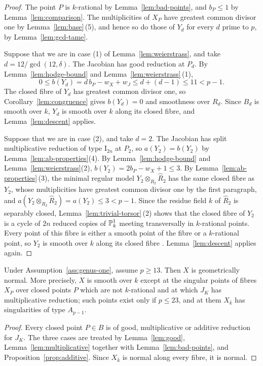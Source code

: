 \begin{proof}
The point $P$ is $k$-rational by Lemma~\ref{lem:bad-points}, and $b_P\leq 1$ by Lemma~\ref{lem:comparison}.
The multiplicities of $X_P$ have greatest common divisor one by Lemma~\ref{lem:base}\,(5), and hence so do those of $Y_d$ for every $d$ prime to $p$, by Lemma~\ref{lem:gcd-tame}.

Suppose that we are in case \textup{(1)} of Lemma~\ref{lem:weierstrass}, and take $d = 12/\gcd(12,\delta)$.
The Jacobian has good reduction at $P_d$.
By Lemma~\ref{lem:hodge-bound} and Lemma~\ref{lem:weierstrass}\,\textup{(1)},
\[
  0\leq b(Y_d) = d\,b_P-w_X+w_J\leq d+(d-1)\leq 11<p-1.
\]
The closed fibre of $Y_d$ has greatest common divisor one, so Corollary~\ref{lem:congruence} gives $b(Y_d) = 0$ and smoothness over $R_d$.
Since $B_d$ is smooth over $k$, $Y_d$ is smooth over $k$ along its closed fibre, and Lemma~\ref{lem:descent} applies.

Suppose that we are in case \textup{(2)}, and take $d = 2$.
The Jacobian has split multiplicative reduction of type $\mathrm I_{2n}$ at $P_2$, so $a(Y_2) = b(Y_2)$ by Lemma~\ref{lem:ab-properties}(4).
By Lemma~\ref{lem:hodge-bound} and Lemma~\ref{lem:weierstrass}(2), $b(Y_2) = 2b_P-w_X+1\leq 3$.
By Lemma~\ref{lem:ab-properties}\,(3), the minimal regular model $Y_2\otimes_{R_2}\widehat R_2$ has the same closed fibre as $Y_2$, whose multiplicities have greatest common divisor one by the first paragraph, and $a(Y_2\otimes_{R_2}\widehat R_2) = a(Y_2)\leq 3<p-1$.
Since the residue field $k$ of $\widehat R_2$ is separably closed, Lemma~\ref{lem:trivial-torsor}\,(2) shows that the closed fibre of $Y_2$ is a cycle of $2n$ reduced copies of $\mathbb{P}^1_k$ meeting transversally in $k$-rational points.
Every point of this fibre is either a smooth point of the fibre or a $k$-rational point, so $Y_2$ is smooth over $k$ along its closed fibre \cite[Tag~]{Stacks}.
Lemma~\ref{lem:descent} applies again.
\end{proof}

\begin{proposition}\label{prop:genus-one}
Under Assumption~\ref{ass:genus-one}, assume $p\geq 13$.
Then $X$ is geometrically normal.
More precisely, $X$ is smooth over $k$ except at the singular points of fibres $X_P$ over closed points $P$ which are not $k$-rational and at which $J_K$ has multiplicative reduction; such points exist only if $p\leq 23$, and at them $X_{\bar k}$ has singularities of type $A_{p-1}$.
\end{proposition}

\begin{proof}
Every closed point $P\in B$ is of good, multiplicative or additive reduction for $J_K$.
The three cases are treated by Lemma~\ref{lem:good}, Lemma~\ref{lem:multiplicative} together with Lemma~\ref{lem:bad-points}, and Proposition~\ref{prop:additive}.
Since $X_{\bar k}$ is normal along every fibre, it is normal.
\end{proof}
